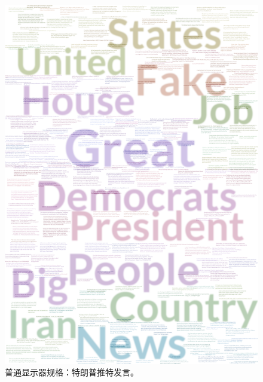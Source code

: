 \begin{figure}[htbp]
	\centering
	\includegraphics[width=\textwidth]{figures/trump.png}
	\caption{普通显示器规格：特朗普推特发言。}
	\label{fig:trump}
\end{figure}

